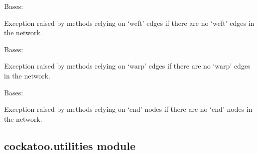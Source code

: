 \documentclass[letterpaper,10pt,english]{sphinxmanual}
\begin{document}

\begin{fulllineitems}
\label{\detokenize{cockatoo:cockatoo.exception.NoWeftEdgesError}}
Bases: {\hyperref[\detokenize{cockatoo:cockatoo.exception.KnitNetworkError}]{}}

Exception raised by methods relying on ‘weft’ edges if there are no ‘weft’
edges in the network.

\end{fulllineitems}


\begin{fulllineitems}
\label{\detokenize{cockatoo:cockatoo.exception.NoWarpEdgesError}}
Bases: {\hyperref[\detokenize{cockatoo:cockatoo.exception.KnitNetworkError}]{}}

Exception raised by methods relying on ‘warp’ edges if there are no ‘warp’
edges in the network.

\end{fulllineitems}


\begin{fulllineitems}
\label{\detokenize{cockatoo:cockatoo.exception.NoEndNodesError}}
Bases: {\hyperref[\detokenize{cockatoo:cockatoo.exception.KnitNetworkError}]{}}

Exception raised by methods relying on ‘end’ nodes if there are no ‘end’
nodes in the network.

\end{fulllineitems}



\subsection{cockatoo.utilities module}
\label{\detokenize{cockatoo:module-cockatoo.utilities}}\label{\detokenize{cockatoo:cockatoo-utilities-module}}
\end{document}
